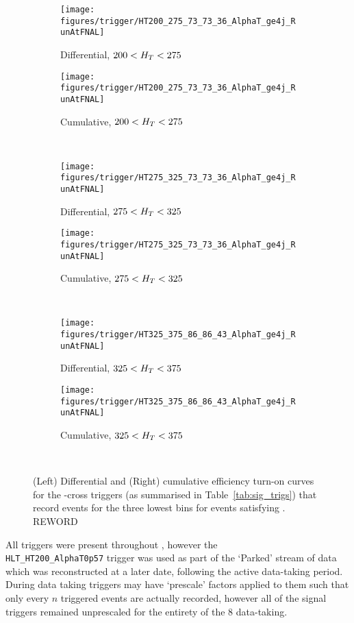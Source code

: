 \begin{figure}[!ht]
  \centering
    
    \begin{subfigure}[b]{0.48\textwidth}
      \texttt{[image: figures/trigger/HT200\_275\_73\_73\_36\_AlphaT\_ge4j\_RunAtFNAL]}
      \caption{Differential, $200 < H_T < 275 $\gev}
    \end{subfigure}
    \begin{subfigure}[b]{0.48\textwidth}
      \texttt{[image: figures/trigger/HT200\_275\_73\_73\_36\_AlphaT\_ge4j\_RunAtFNAL]}
      \caption{Cumulative, $200 < H_T < 275 $\gev}
    \end{subfigure} \\
    \begin{subfigure}[b]{0.48\textwidth}
      \texttt{[image: figures/trigger/HT275\_325\_73\_73\_36\_AlphaT\_ge4j\_RunAtFNAL]}
      \caption{Differential, $275 < H_T < 325 $\gev}
    \end{subfigure}
    \begin{subfigure}[b]{0.48\textwidth}
      \texttt{[image: figures/trigger/HT275\_325\_73\_73\_36\_AlphaT\_ge4j\_RunAtFNAL]}
      \caption{Cumulative, $275 < H_T < 325 $\gev}
    \end{subfigure} \\
    \begin{subfigure}[b]{0.48\textwidth}
      \texttt{[image: figures/trigger/HT325\_375\_86\_86\_43\_AlphaT\_ge4j\_RunAtFNAL]}
      \caption{Differential, $325 < H_T < 375 $\gev}
    \end{subfigure}
    \begin{subfigure}[b]{0.48\textwidth}
      \texttt{[image: figures/trigger/HT325\_375\_86\_86\_43\_AlphaT\_ge4j\_RunAtFNAL]}
      \caption{Cumulative, $325 < H_T < 375 $\gev}
    \end{subfigure} \\
  
    \caption{\label{fig:eff_alphat_ge4j}
      (Left) Differential and (Right) cumulative efficiency turn-on
      curves for the \HT-\alphat cross triggers (as summarised in
      Table~\ref{tab:sig_trigs}) that record events for the
      three lowest \HT bins  for events satisfying \njhigh. REWORD
    }
\end{figure}

All triggers were present throughout \runone, however the 
\\\verb!HLT_HT200_AlphaT0p57! trigger was used as part of the `Parked' stream of 
data which was reconstructed at a later date, following the active data-taking 
period. During data taking triggers may have `prescale' factors applied to them 
such that only every $n$ triggered events are actually recorded, however all of
the signal triggers remained unprescaled for the entirety of the 8\tev
data-taking.




